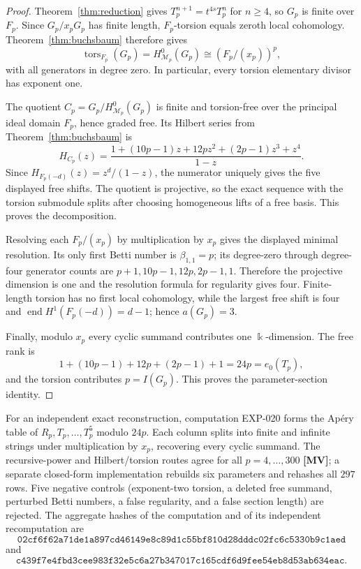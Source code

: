 \documentclass[11pt]{article}
\theoremstyle{definition}
\theoremstyle{remark}
\newcommand{\kfield}{\Bbbk}
\begin{document}
\begin{proof}
Theorem~\ref{thm:reduction} gives $T_p^{n+1}=t^{4s}T_p^n$ for $n\ge4$, so $G_p$ is finite over
$F_p$. Since $G_p/x_pG_p$ has finite length, $F_p$-torsion equals zeroth local cohomology.
Theorem~\ref{thm:buchsbaum} therefore gives
\[
\operatorname{tors}_{F_p}(G_p)=H^0_{\mathcal M_p}(G_p)\cong(F_p/(x_p))^p,
\]
with all generators in degree zero. In particular, every torsion elementary divisor has exponent
one.

The quotient $C_p=G_p/H^0_{\mathcal M_p}(G_p)$ is finite and torsion-free over the principal
ideal domain $F_p$, hence graded free. Its Hilbert series from Theorem~\ref{thm:buchsbaum} is
\[
H_{C_p}(z)=\frac{1+(10p-1)z+12pz^2+(2p-1)z^3+z^4}{1-z}.
\]
Since $H_{F_p(-d)}(z)=z^d/(1-z)$, the numerator uniquely gives the five displayed free shifts.
The quotient is projective, so the exact sequence with the torsion submodule splits after choosing
homogeneous lifts of a free basis. This proves the decomposition.

Resolving each $F_p/(x_p)$ by multiplication by $x_p$ gives the displayed minimal resolution. Its
only first Betti number is $\beta_{1,1}=p$; its degree-zero through degree-four generator counts
are $p+1,10p-1,12p,2p-1,1$. Therefore the projective dimension is one and the resolution formula
for regularity gives four. Finite-length torsion has no first local cohomology, while the largest
free shift is four and $\operatorname{end}H^1(F_p(-d))=d-1$; hence $a(G_p)=3$.

Finally, modulo $x_p$ every cyclic summand contributes one $\kfield$-dimension. The free rank is
\[
1+(10p-1)+12p+(2p-1)+1=24p=e_0(T_p),
\]
and the torsion contributes $p=I(G_p)$. This proves the parameter-section identity.
\end{proof}

For an independent exact reconstruction, computation EXP-020 forms the Ap\'ery table of
$R_p,T_p,\ldots,T_p^5$ modulo $24p$. Each column splits into finite and infinite strings under
multiplication by $x_p$, recovering every cyclic summand. The recursive-power and Hilbert/torsion
routes agree for all $p=4,\ldots,300$ \textbf{[MV]}; a separate closed-form implementation rebuilds
six parameters and rehashes all $297$ rows. Five negative controls (exponent-two torsion, a deleted
free summand, perturbed Betti numbers, a false regularity, and a false section length) are
rejected. The aggregate hashes of the computation and of its independent recomputation are
\[
\texttt{02cf6f62a71de1a897cd46149e8c89d1c55bf810d28dddc02fc6c5330b9c1aed}
\]
and
\[
\texttt{c439f7e4fbd3cee983f32e5c6a27b347017c165cdf6d9fee54eb8d53ab634eac}.
\]
\end{document}
